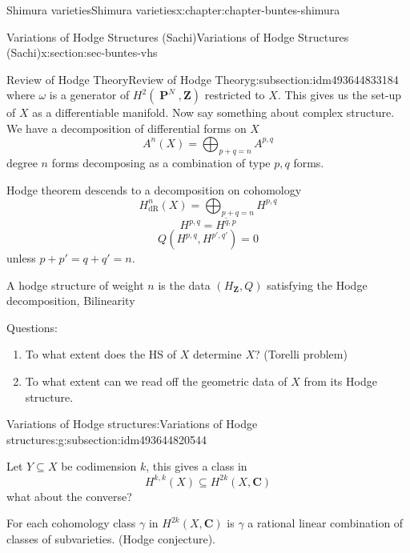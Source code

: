 \documentclass[oneside,10pt,]{book}
\numberwithin{equation}{section}
\newcommand{\ZZ}{\mathbf{Z}}
\newcommand{\CC}{\mathbf{C}}
\newcommand{\dR}{\mathrm{dR}}
\DeclareMathOperator{\PP}{\mathbf{P}}
\begin{document}
\begin{chapterptx}{Shimura varieties}{}{Shimura varieties}{}{}{x:chapter:chapter-buntes-shimura}
\begin{sectionptx}{Variations of Hodge Structures (Sachi)}{}{Variations of Hodge Structures (Sachi)}{}{}{x:section:sec-buntes-vhs}
\begin{subsectionptx}{Review of Hodge Theory}{}{Review of Hodge Theory}{}{}{g:subsection:idm493644833184}
\begin{equation*}
\end{equation*}
where \(\omega\) is a generator of \(H^2( \PP^N , \ZZ)\) restricted to \(X\). This gives us the set-up of \(X\) as a differentiable manifold. Now say something about complex structure. We have a decomposition of differential forms on \(X\)%
\begin{equation*}
A^n(X) = \bigoplus_{p+q  =n} A^{p,q}
\end{equation*}
degree \(n\) forms decomposing as a combination of type \(p,q\) forms.%
\par
Hodge theorem descends to a decomposition on cohomology%
\begin{equation*}
H^n_\dR(X) = \bigoplus_{p+q = n} H^{p,q}
\end{equation*}
%
\begin{equation*}
H^{p,q} = \overline{H^{q,p}}
\end{equation*}
%
\begin{equation*}
Q(H^{p,q}, H^{p',q'}) = 0
\end{equation*}
unless \(p+p' = q+q' = n\).%
\par
A hodge structure of weight \(n\) is the data \((H_\ZZ, Q)\) satisfying the Hodge decomposition, Bilinearity%
\par
Questions:%
\begin{enumerate}
\item{}To what extent does the HS of \(X\) determine \(X\)? (Torelli problem)%
\item{}To what extent can we read off the geometric data of \(X\) from its Hodge structure.%
\end{enumerate}
%
\end{subsectionptx}
%
%
\typeout{************************************************}
\typeout{************************************************}
%
\begin{subsectionptx}{Variations of Hodge structures:}{}{Variations of Hodge structures:}{}{}{g:subsection:idm493644820544}
\begin{introduction}{}%
Let \(Y \subseteq X\) be codimension \(k\), this gives a class in%
\begin{equation*}
H^{k,k}(X) \subseteq H^{2k}(X,\CC)
\end{equation*}
what about the converse?%
\par
For each cohomology class \(\gamma\)  in \(H^{2k} (X,\CC)\) is \(\gamma\) a rational linear combination of classes of subvarieties. (Hodge conjecture).%
\end{introduction}%

\end{subsectionptx}
\end{sectionptx}
\end{chapterptx}
\end{document}
